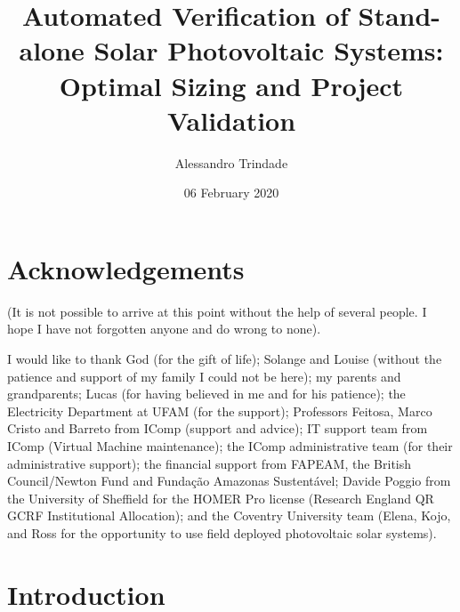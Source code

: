 \documentclass[12pt,twoside]{report}
\title{Automated Verification of Stand-alone Solar Photovoltaic Systems: Optimal Sizing and Project Validation}
\author{Alessandro Trindade}
\date{06 February 2020}
\renewcommand{\headrulewidth}{0.4pt}
\renewcommand{\footrulewidth}{0.4pt}
\begin{document}



\thispagestyle{empty}


\newpage 


\pagestyle{empty}
\newpage



%
%
\chapter*{Acknowledgements}
(It is not possible to arrive at this point without the help of several people. I hope I have not forgotten anyone and do wrong to none).

I would like to thank God (for the gift of life); Solange and Louise (without the patience and support of my family I could not be here); my parents and grandparents; Lucas (for having believed in me and for his patience); the Electricity Department at UFAM (for the support); Professors Feitosa, Marco Cristo and Barreto from IComp (support and advice); IT support team from IComp (Virtual Machine maintenance); the IComp administrative team (for their administrative support); the financial support from FAPEAM, the British Council/Newton Fund and Fundação Amazonas Sustentável; Davide Poggio from the University of Sheffield for the HOMER Pro license (Research England QR GCRF Institutional Allocation); and the Coventry University team (Elena, Kojo, and Ross for the opportunity to use field deployed photovoltaic solar systems).

\pagestyle{empty}

\tableofcontents

\listoffigures

\listoftables
\newpage 


\chapter{Introduction}
\pagestyle{fancy}
\fancyhead{}
\fancyfoot{}
\fancyfoot[LE,RO]{\thepage}
\renewcommand{\headrulewidth}{0.4pt}
\renewcommand{\footrulewidth}{0.4pt}

\end{document}
